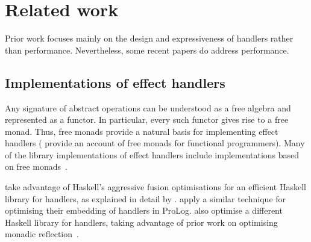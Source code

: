 \documentclass[12pt,mscres,cdtppar,twoside,openright,logo,rightchapter,normalheadings]{infthesis}
\theoremstyle{definition}
\begin{document}


\section{Related work}
\label{sec:related-work}

Prior work focuses mainly on the design and expressiveness of handlers
rather than performance. Nevertheless, some recent papers do address
performance.

\subsection{Implementations of effect handlers}
Any signature of abstract operations can be understood as a free
algebra and represented as a functor. In particular, every such
functor gives rise to a free monad. Thus, free monads provide a
natural basis for implementing effect handlers (\citet{Swierstra2008b}
provide an account of free monads for functional programmers).  Many
of the library implementations of effect handlers include
implementations based on free monads~\citep{Kammar2013, Kiselyov2013,
  Kiselyov2015, Brady2013, Wu2014}.


\citet{Kammar2013} take advantage of Haskell's aggressive fusion
optimisations for an efficient Haskell library for handlers, as
explained in detail by \citet{Wu2015}. \citet{Saleh2016} apply a
similar technique for optimising their embedding of handlers in
ProLog. \citet{Kiselyov2015} also optimise a different Haskell library
for handlers, taking advantage of prior work on optimising monadic
reflection~\citep{Ploeg2014}.
\end{document}
